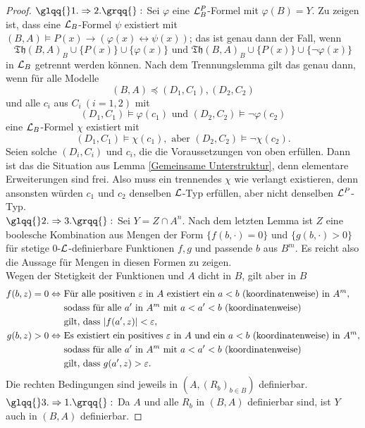 \begin{proof}
	$\glqq{}1.\Rightarrow 2.\grqq{}:$ Sei $\varphi$ eine $\mathcal{L}^P_B$-Formel mit $\varphi(B)=Y$. Zu zeigen ist, dass eine $\mathcal{L}_B$-Formel $\psi$ existiert mit $(B,A)\models P(x)\rightarrow(\varphi(x)\leftrightarrow\psi(x))$;
	 das ist genau dann der Fall, wenn $$\mathfrak{Th}(B,A)_B\cup\{P(x)\}\cup\{\varphi(x)\}\text{ und }\mathfrak{Th}(B,A)_B\cup\{P(x)\}\cup\{\neg\varphi(x)\}$$ in $\mathcal{L}_B$ getrennt werden können. Nach dem Trennungslemma gilt das genau dann, wenn für alle Modelle $$(B,A)\preceq(D_1,C_1),(D_2,C_2)$$ und alle $c_i$ aus $C_i\ (i=1,2)$ mit $$(D_1,C_1)\models\varphi(c_1)\text{ und }(D_2,C_2)\models\neg\varphi(c_2)$$ eine $\mathcal{L}_B$-Formel $\chi$ existiert mit $$(D_1,C_1)\models\chi(c_1),\text{ aber }(D_2,C_2)\models\neg\chi(c_2).$$
	Seien solche $(D_i,C_i)$ und $c_i$, die die Voraussetzungen von oben erfüllen. Dann ist das die Situation aus Lemma \ref{Gemeinsame Unterstruktur}, denn elementare Erweiterungen sind frei. Also muss ein trennendes $\chi$ wie verlangt existieren, denn ansonsten würden $c_1$ und $c_2$ denselben $\mathcal{L}$-Typ erfüllen, aber nicht denselben $\mathcal{L}^P$-Typ.\\
	$\glqq{}2.\Rightarrow 3.\grqq{}:$ Sei $Y=Z\cap A^n$. Nach dem letzten Lemma ist $Z$ eine boolesche Kombination aus Mengen der Form $\{f(b,\cdot)=0\}$ und $\{g(b,\cdot)>0\}$ für stetige 0-$\mathcal{L}$-definierbare Funktionen $f,g$ und passende $b$ aus $B^m$. Es reicht also die Aussage für Mengen in diesen Formen zu zeigen.\\
	Wegen der Stetigkeit der Funktionen und $A$ dicht in $B$, gilt aber in $B$
	\begin{align*}
	f(b,z)=0\Leftrightarrow\ &\text{Für alle positiven }\varepsilon\text{ in }A\text{ existiert ein }a<b\text{ (koordinatenweise) in }A^m,\\&\text{sodass für alle }a'\text{ in }A^m\text{ mit }a<a'<b\text{ (koordinatenweise)}\\&\text{gilt, dass }{\left| f(a',z) \right|}<\varepsilon,\\
	g(b,z)>0\Leftrightarrow\ &\text{Es existiert ein positives }\varepsilon\text{ in }A\text{ und ein }a<b\text{ (koordinatenweise) in }A^m,\\&\text{sodass für alle }a'\text{ in }A^m\text{ mit }a<a'<b\text{ (koordinatenweise)}\\&\text{gilt, dass }g(a',z)>\varepsilon.
	\end{align*}
	Die rechten Bedingungen sind jeweils in $(A,(R_b)_{b\in B})$ definierbar.\\
	$\glqq{}3.\Rightarrow 1.\grqq{}:$ Da $A$ und alle $R_b$ in $(B,A)$ definierbar sind, ist $Y$ auch in $(B,A)$ definierbar.
\end{proof}

